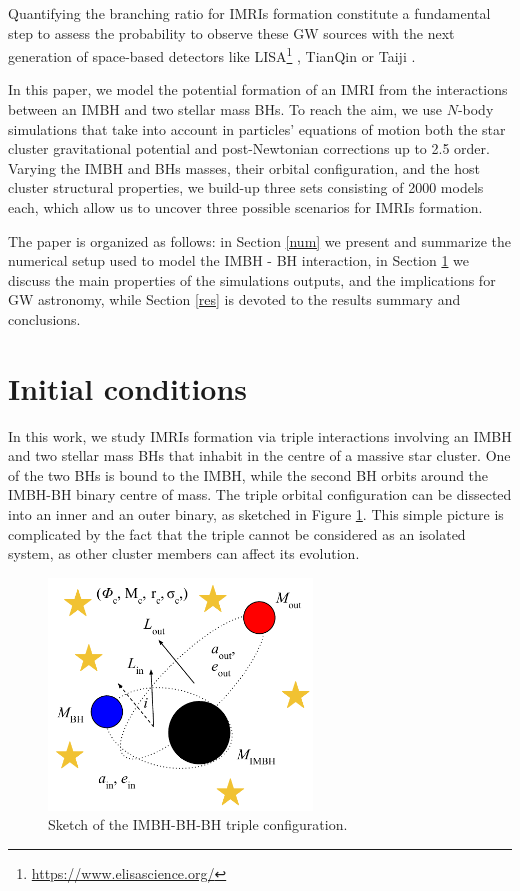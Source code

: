 \documentclass[twocolumn]{aastex62}
\begin{document}
Quantifying the branching ratio for IMRIs formation constitute a fundamental
step to assess the probability to observe these GW sources with the next
generation of space-based detectors like
LISA\footnote{\url{https://www.elisascience.org/}} \citep{seoane07}, TianQin
\citep{tianqin16} or Taiji \citep{taiji17}.

In this paper, we model the potential formation of an IMRI from the
interactions between an IMBH and two stellar mass BHs. To reach the aim, we use
$N$-body simulations that take into account in particles' equations of motion
both the star cluster gravitational potential and post-Newtonian corrections up
to 2.5 order. Varying the IMBH and BHs masses, their orbital configuration, and
the host cluster structural properties, we build-up three sets consisting of
2000 models each, which allow us to uncover three possible scenarios for IMRIs
formation. 

The paper is organized as follows: in Section \ref{num} we present and
summarize the numerical setup used to model the IMBH - BH interaction, in
Section \ref{met} we discuss the main properties of the simulations outputs,
and the implications for GW astronomy, while Section \ref{res} is devoted to
the results summary and conclusions. 


\section{Initial conditions} \label{met}

In this work, we study IMRIs formation via triple interactions involving an
IMBH and two stellar mass BHs that inhabit in the centre of a massive star
cluster.  One of the two BHs is bound to the IMBH, while the second BH orbits
around the IMBH-BH binary centre of mass. The triple orbital configuration can
be dissected into an inner and an outer binary, as sketched in Figure
\ref{fig:f1}. This simple picture is complicated by the fact that the triple
cannot be considered as an isolated system, as other cluster members can affect
its evolution.

\begin{figure}
    \centering
    \includegraphics[width=7cm]{triple}
    \caption{Sketch of the IMBH-BH-BH triple configuration.}
    \label{fig:f1}
\end{figure}
\end{document}
